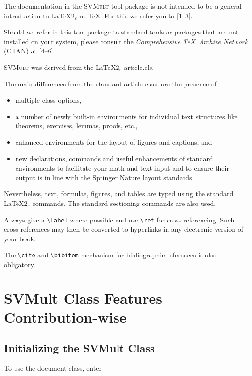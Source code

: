 \documentclass[graybox]{svmult}
\begin{document}
\begin{refguide}
\begin{sloppy}
The documentation in the \textsc{SVMult} tool package is not intended to be a general introduction to \LaTeX2$_{\varepsilon}$ or \TeX. For this we refer you to [1--3].

Should we refer in this tool package to standard tools or packages that are not installed on your system, please consult the \textit{Comprehensive \TeX\ Archive Network} (CTAN) at [4--6].

\textsc{SVMult} was derived from the \LaTeX2$_{\varepsilon}$ article.cls.
%

The main differences from the standard article class are the presence of
\begin{itemize}
\item multiple class options,
\item a number of newly built-in environments for individual text structures like theorems, exercises, lemmas, proofs, etc.,
\item enhanced environments for the layout of figures and captions, and
\item new declarations, commands and useful enhancements of standard environments to facilitate your math and text input and to ensure their output is in line with the Springer Nature layout standards.
\end{itemize}%


Nevertheless, text, formulae, figures, and tables are typed using the standard \LaTeX2$_{\varepsilon}$ commands. The standard sectioning commands are also used.
%

Always give a \verb|\label| where possible and use \verb|\ref| for cross-referencing. Such cross-references may then be converted to hyperlinks in any electronic version of your book.
%

The \verb|\cite| and \verb|\bibitem| mechanism for bibliographic references is also obligatory.

\section{SVMult Class Features --- Contribution-wise}\label{sec:2}

\subsection{Initializing the SVMult Class}\label{subsec:1}
To use the document class, enter

\cprotect{}



\end{sloppy}
\end{refguide}
\end{document}
